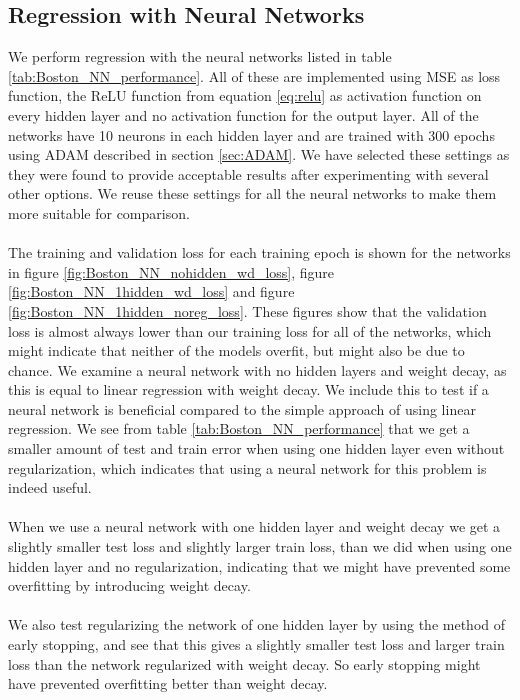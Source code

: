 \subsection{Regression with Neural Networks}\label{sec:regre_w_NN}
We perform regression with the neural networks listed in table \ref{tab:Boston_NN_performance}. All of these are implemented using MSE as loss function, the ReLU function from equation \ref{eq:relu} as activation function on every hidden layer and no activation function for the output layer. All of the networks have 10 neurons in each hidden layer and are trained with 300 epochs using ADAM described in section \ref{sec:ADAM}. We have selected these settings as they were found to provide acceptable results after experimenting with several other options. We reuse these settings for all the neural networks to make them more suitable for comparison. 
\\
\\
The training and validation loss for each training epoch is shown for the networks in figure \ref{fig:Boston_NN_nohidden_wd_loss}, figure \ref{fig:Boston_NN_1hidden_wd_loss} and figure \ref{fig:Boston_NN_1hidden_noreg_loss}. These figures show that the validation loss is almost always lower than our training loss for all of the networks, which might indicate that neither of the models overfit, but might also be due to chance. 
\noindent
We examine a neural network with no hidden layers and weight decay, as this is equal to linear regression with weight decay. We include this to test if a neural network is beneficial compared to the simple approach of using linear regression. We see from table \ref{tab:Boston_NN_performance} that we get a smaller amount of test and train error when using one hidden layer even without regularization, which indicates that using a neural network for this problem is indeed useful.
\\
\\
When we use a neural network with one hidden layer and weight decay we get a slightly smaller test loss and slightly larger train loss, than we did when using one hidden layer and no regularization, indicating that we might have prevented some overfitting by introducing weight decay. 
\\
\\
We also test regularizing the network of one hidden layer by using the method of early stopping, and see that this gives a slightly smaller test loss and larger train loss than the network regularized with weight decay. So early stopping might have prevented overfitting better than weight decay.
